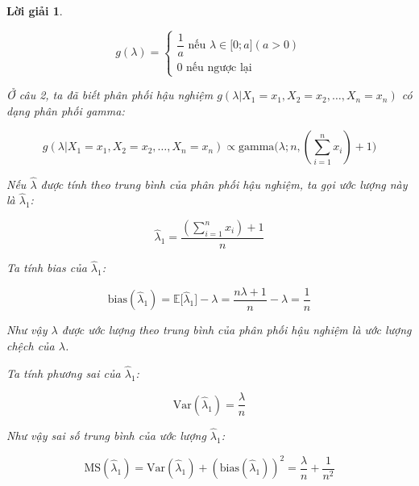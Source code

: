 \documentclass[14pt, a4paper]{article}
\theoremstyle{sltheorem}
\theoremstyle{soltheorem}
\newtheorem*{loigiai}{Lời giải}
\begin{document}
\begin{loigiai}
\begin{enumerate}
\begin{itemize}
            \begin{equation*}
                g(\lambda) = \begin{cases}
                    \dfrac{1}{a} \text{ nếu } \lambda \in \lbrack 0; a\rbrack (a > 0) \\
                    0 \text{ nếu ngược lại}
                \end{cases}
            \end{equation*}

            Ở câu 2, ta đã biết phân phối hậu nghiệm $g(\lambda \vert X_1 =x_1, X_2=x_2, \dots, X_n=x_n)$ có dạng phân phối gamma:

            \begin{equation*}
                g(\lambda \vert X_1 =x_1, X_2=x_2, \dots, X_n=x_n) \propto \text{gamma}\big(\lambda; n, (\sum_{i=1}^n x_i) + 1\big)
            \end{equation*}

            Nếu $\hat{\lambda}$ được tính theo trung bình của phân phối hậu nghiệm,
            ta gọi ước lượng này là $\hat{\lambda}_1$:

            \begin{equation*}
                \hat{\lambda}_1 = \dfrac{(\sum_{i=1}^n x_i) + 1}{n}
            \end{equation*}

            Ta tính bias của $\hat{\lambda}_1$:

            \begin{equation*}
                \text{bias}(\hat{\lambda}_1) = \mathbb{E} \lbrack \hat{\lambda}_1 \rbrack - \lambda = \dfrac{n\lambda + 1}{n} - \lambda = \dfrac{1}{n}
            \end{equation*}

            Như vậy $\lambda$ được ước lượng theo trung bình của phân phối hậu nghiệm là ước lượng chệch của $\lambda$.

            Ta tính phương sai của $\hat{\lambda}_1$:
            
            \begin{equation*}
                \text{Var}(\hat{\lambda}_1) = \dfrac{\lambda}{n}
            \end{equation*}

            Như vậy sai số trung bình của ước lượng $\hat{\lambda}_1$:

            \begin{equation*}
                \text{MS}(\hat{\lambda}_1) = \text{Var}(\hat{\lambda}_1) + (\text{bias}(\hat{\lambda}_1))^2 = \dfrac{\lambda}{n} + \dfrac{1}{n^2}
            \end{equation*}


\end{itemize}
\end{enumerate}
\end{loigiai}
\end{document}
